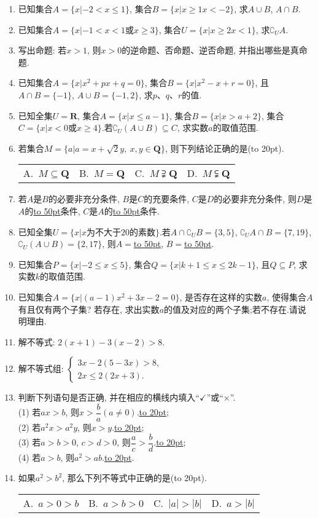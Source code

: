 \documentclass[10pt,a4paper]{article}
\newcommand{\blank}[1]{\underline{\hbox to #1pt{}}}
\newcommand{\bracket}[1]{(\hbox to #1pt{})}
\newcommand{\fourch}[4]{\par\begin{tabular}{p{.23\textwidth}p{.23\textwidth}p{.23\textwidth}p{.23\textwidth}}
A.~#1 &B.~#2& C.~#3& D.~#4
\end{tabular}}
\begin{document}
\begin{enumerate}[1.]
\item 已知集合$A=\{x|-2<x\le 1\}$, 集合$B=\{x|x\ge 1x<-2\}$, 求$A\cup B$, $A\cap B$.
\item 已知集合$A=\{x|-1<x<1$或$x\ge 3\}$, 集合$U=\{x|x\ge 2x<1\}$, 求$\complement _UA$.
\item 写出命题: 若$x>1$, 则$x>0$的逆命题、否命题、逆否命题, 并指出哪些是真命题.
\item 已知集合$A=\{x|x^2+px+q=0\}$, 集合$B=\{x|x^2-x+r=0\}$, 且$A\cap B=\{-1\}$, $A\cup B=\{-1,2\}$, 求$p$、$q$、$r$的值.
\item 已知全集$U=\mathbf{R}$, 集合$A=\{x|x\le a-1\}$, 集合$B=\{x|x>a+2\}$, 集合$C=\{x|x<0$或$x\ge 4\}$.若$\complement _U(A\cup B)\subseteq C$, 求实数$a$的取值范围.
\item 若集合$M=\{a|a=x+\sqrt 2y,\ x,y\in \mathbf{Q}\}$, 则下列结论正确的是\bracket{20}.
\fourch{$M\subseteq \mathbf{Q}$}{$M=\mathbf{Q}$}{$M\supsetneqq \mathbf{Q}$}{$M\subsetneqq \mathbf{Q}$}
\item 若$A$是$B$的必要非充分条件, $B$是$C$的充要条件, $C$是$D$的必要非充分条件, 则$D$是$A$的\blank{50}条件, $C$是$A$的\blank{50}条件.
\item 已知全集$U=\{x|x$为不大于$20$的素数$\}$.若$A\cap \complement _UB=\{3,5\}$, $\complement _UA\cap B=\{7,19\}$, $\complement _U(A\cup B)=\{2,17\}$, 则$A=$\blank{50}, $B=$\blank{50}.
\item 已知集合$P=\{x|-2\le x\le 5\}$, 集合$Q=\{x|k+1\le x\le 2k-1\}$, 且$Q\subseteq P$, 求实数$k$的取值范围.
\item 已知集合$A=\{x|(a-1)x^2+3x-2=0\}$, 是否存在这样的实数$a$, 使得集合$A$有且仅有两个子集? 若存在, 求出实数$a$的值及对应的两个子集;若不存在.请说明理由.
\item 解不等式: $2(x+1)-3(x-2)>8$.
\item 解不等式组: $\begin{cases} 3x-2(5-3x)>8, \\ 2x\le 2(2x+3). \end{cases}$
\item 判断下列语句是否正确, 并在相应的横线内填入``$\checkmark$''或``$\times$''.\\
(1) 若$ax>b$, 则$x>\dfrac ba(a\ne 0)$.\blank{20};\\
(2) 若$a^2x>a^2y$, 则$x>y$.\blank{20};\\
(3) 若$a>b>0$, $c>d>0$, 则$\dfrac ac>\dfrac bd$.\blank{20};\\
(4) 若$a>b$, 则$a^2>ab$.\blank{20}.
\item 如果$a^2>b^2$, 那么下列不等式中正确的是\bracket{20}.
\fourch{$a>0>b$}{$a>b>0$}{$|a|>|b|$}{$a>|b|$}

\end{enumerate}
\end{document}
